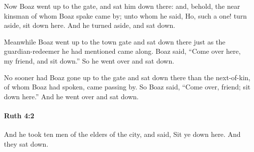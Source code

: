 			\begin{versebox}
					\item[BHS] 
					\item[LXX] 
					\item[ASV] Now Boaz went up to the gate, and sat him down there: and, behold, the near kinsman of whom Boaz spake came by; unto whom he said, Ho, such a one! turn aside, sit down here. And he turned aside, and sat down.
					\item[NIV] Meanwhile Boaz went up to the town gate and sat down there just as the guardian-redeemer he had mentioned came along. Boaz said, “Come over here, my friend, and sit down.” So he went over and sat down.
					\item[NRSV] No sooner had Boaz gone up to the gate and sat down there than the next-of-kin, of whom Boaz had spoken, came passing by. So Boaz said, “Come over, friend; sit down here.” And he went over and sat down.
			\end{versebox}

		\paragraph{Ruth 4:2} %
			\label{RUTH-4-2}

			And he took ten men of the elders of the city, and said, Sit ye down here. And they sat down.

